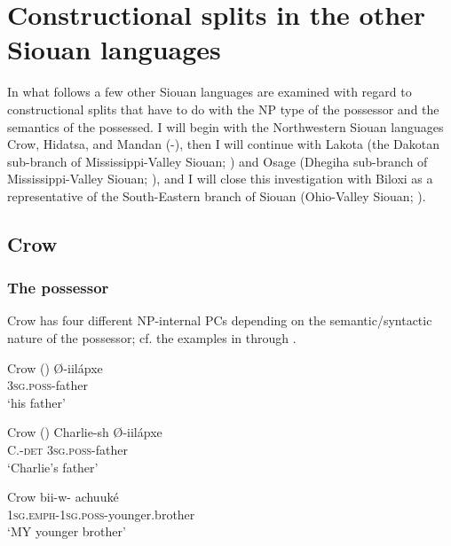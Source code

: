 \documentclass[output=paper]{LSP/langsci}
\begin{document}
\section{Constructional splits in the other Siouan languages}

In what follows a few other Siouan languages are examined with regard to constructional splits that have to do with the NP type of the possessor and the semantics of the possessed. I will begin with the Northwestern Siouan languages Crow, Hidatsa, and Mandan (-), then I will continue with Lakota (the Dakotan sub-branch of Mississippi-Valley Siouan; ) and Osage (Dhegiha sub-branch of Mississippi-Valley Siouan; ), and I will close this investigation with Biloxi as a representative of the South-Eastern branch of Siouan (Ohio-Valley Siouan; ).

\subsection{Crow}\label{sec:helmbrecht:4.1}
\subsubsection{The possessor}
Crow has four different NP-internal PCs depending on the semantic/syntactic nature of the possessor; cf. the examples in  through . 

\ea Crow (\citealt[234]{Graczyk2007}) \label{crowfather}
\ex
\gll Ø-iilápxe \\
\textsc{3sg.poss}-father \\
\glt `his father'
\z
\z

\ea Crow (\citealt[234]{Graczyk2007}) \label{crowcharlie}
\ex
\gll Charlie-sh 		Ø-iilápxe \\
C.-\textsc{det}      \textsc{3sg.poss}-father \\
\glt `Charlie's father'
\z \z

\ea	Crow \citep[235]{Graczyk2007} \label{crowbrother}
\ex 
\gll bii-w- achuuké \\
\textsc{1sg.emph-1sg.poss}-younger.brother \\
\glt `MY younger brother'
\z \z
\end{document}
